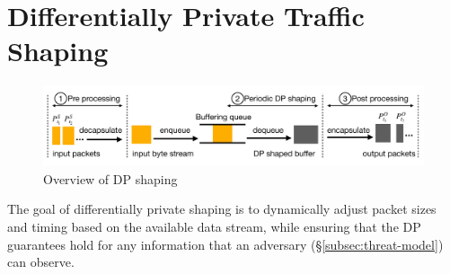 \section{Differentially Private Traffic Shaping}
\label{sec:dp}

\begin{figure}[t]
    \centering
    \includegraphics[width=\columnwidth]{dp-overview-fixed.pdf}
    \caption{Overview of DP shaping}
    \vspace{-0.4cm}
    \label{fig:dp-overview}
\end{figure}

The goal of differentially private shaping is to dynamically adjust packet
sizes and timing based on the available data stream, while ensuring that the DP
guarantees hold for any information that an adversary
(\S\ref{subsec:threat-model}) can observe.

